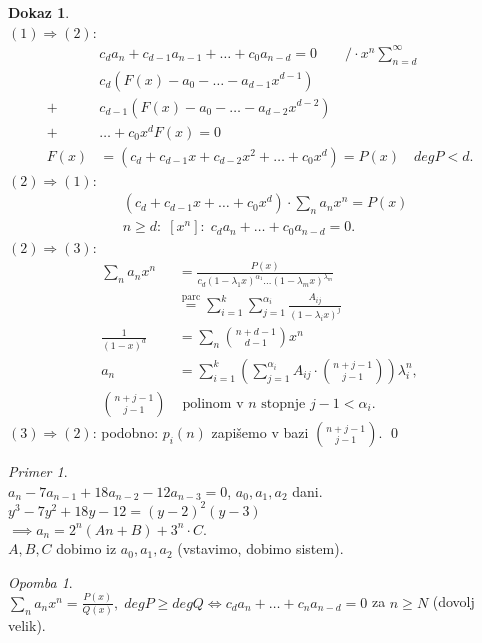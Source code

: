 \documentclass[a4paper, 12pt]{book}
\theoremstyle{definition}
\newtheorem{pro}[counter]{Dokaz}
\theoremstyle{remark}
\newtheorem*{ex}{Primer}
\newtheorem*{rem}{Opomba}
\begin{document}
\begin{pro} \text{} \\
  $(1) \Longrightarrow (2)$:
  \begin{align*}
    &c_d a_n + c_{d-1} a_{n-1} + \dots + c_0 a_{n-d} = 0 \qquad / \cdot x^n \sum_{n=d}^{\infty} \\
    &c_d (F(x) - a_0 - \dots - a_{d-1} x^{d-1}) \\
    +& c_{d-1} (F(x) - a_0 - \dots - a_{d-2} x^{d-2}) \\
    +& \dots + c_0 x^d F(x) = 0 \\
    F(x) &= (c_d + c_{d-1} x + c_{d-2} x^2 + \dots + c_0 x^d) = P(x) \quad deg P < d.
  \end{align*}
  $(2) \Longrightarrow (1)$:
  \begin{align*}
    &(c_d + c_{d-1} x + \dots + c_0 x^d) \cdot \sum_n a_n x^n = P(x) \\
    &n \geq d: \; [x^n]: \; c_d a_n + \dots + c_0 a_{n-d} = 0.
  \end{align*}
  $(2) \Longrightarrow (3)$:
  \begin{align*}
    \sum_n a_n x^n &= \frac{P(x)}{c_d (1-\lambda_1 x)^{\alpha_1} \dots (1-\lambda_m x)^{\lambda_m}} \\
    &\stackrel{\text{parc}}{=} \sum_{i=1}^{k} \sum_{j=1}^{\alpha_i} \frac{A_{ij}}{(1-\lambda_i x)^{j}} \\
    \frac{1}{(1-x)^d} &= \sum_n \binom{n+d-1}{d-1} x^n \\
    a_n &= \sum_{i=1}^{k} \left(\sum_{j=1}^{\alpha_i} A_{ij} \cdot \binom{n+j-1}{j-1}\right) \lambda_i^n, \\
    \binom{n+j-1}{j-1} &\text{ polinom v $n$ stopnje } j-1 < \alpha_i.
  \end{align*}
  $(3) \Longrightarrow (2)$: podobno: $p_i(n)$ zapišemo v bazi $\binom{n+j-1}{j-1}$.
  \qed
\end{pro}
\begin{ex} \text{} \\
  $a_n - 7 a_{n-1} + 18 a_{n-2} - 12 a_{n-3} = 0$, $a_0, a_1, a_2$ dani. \\
  $y^3 - 7 y^2 + 18 y - 12 = (y-2)^2 (y-3)$ \\
  $\implies a_n = 2^n (An + B) + 3^n \cdot C$. \\
  $A,B,C$ dobimo iz $a_0, a_1, a_2$ (vstavimo, dobimo sistem).
\end{ex}
\begin{rem} \text{} \\
  $\sum_n a_n x^n = \frac{P(x)}{Q(x)}, \; deg P \geq deg Q \iff c_d a_n + \dots + c_n a_{n-d} = 0$ za $n \geq N$ (dovolj velik).
\end{rem}
\end{document}
